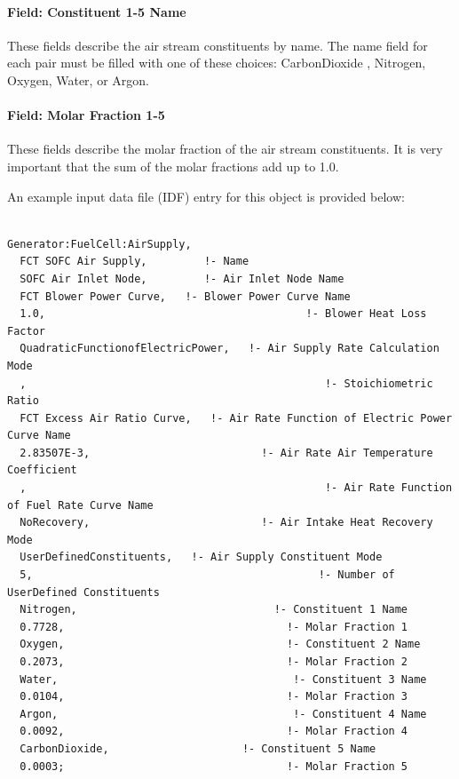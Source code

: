 \paragraph{Field: Constituent 1-5 Name}\label{field-constituent-1-5-name}

These fields describe the air stream constituents by name. The name field for each pair must be filled with one of these choices: CarbonDioxide , Nitrogen, Oxygen, Water, or Argon.

\paragraph{Field: Molar Fraction 1-5}\label{field-molar-fraction-1-5}

These fields describe the molar fraction of the air stream constituents. It is very important that the sum of the molar fractions add up to 1.0.

An example input data file (IDF) entry for this object is provided below:

\begin{lstlisting}

Generator:FuelCell:AirSupply,
  FCT SOFC Air Supply,         !- Name
  SOFC Air Inlet Node,         !- Air Inlet Node Name
  FCT Blower Power Curve,   !- Blower Power Curve Name
  1.0,                                         !- Blower Heat Loss Factor
  QuadraticFunctionofElectricPower,   !- Air Supply Rate Calculation Mode
  ,                                               !- Stoichiometric Ratio
  FCT Excess Air Ratio Curve,   !- Air Rate Function of Electric Power Curve Name
  2.83507E-3,                           !- Air Rate Air Temperature Coefficient
  ,                                               !- Air Rate Function of Fuel Rate Curve Name
  NoRecovery,                           !- Air Intake Heat Recovery Mode
  UserDefinedConstituents,   !- Air Supply Constituent Mode
  5,                                             !- Number of UserDefined Constituents
  Nitrogen,                               !- Constituent 1 Name
  0.7728,                                   !- Molar Fraction 1
  Oxygen,                                   !- Constituent 2 Name
  0.2073,                                   !- Molar Fraction 2
  Water,                                     !- Constituent 3 Name
  0.0104,                                   !- Molar Fraction 3
  Argon,                                     !- Constituent 4 Name
  0.0092,                                   !- Molar Fraction 4
  CarbonDioxide,                     !- Constituent 5 Name
  0.0003;                                   !- Molar Fraction 5
\end{lstlisting}

